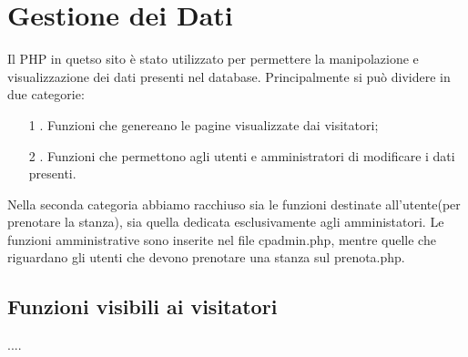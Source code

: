 \section{Gestione dei Dati}
Il PHP in quetso sito è stato utilizzato per permettere la manipolazione e visualizzazione dei dati presenti nel database. Principalmente si può dividere in due categorie:
\begin{itemize}
	\item [1]. Funzioni che genereano le pagine visualizzate dai visitatori;
	\item [2]. Funzioni che permettono agli utenti e amministratori di modificare i dati presenti.
\end{itemize}
Nella seconda categoria abbiamo racchiuso sia le funzioni destinate all'utente(per prenotare la stanza), sia quella dedicata esclusivamente agli amministatori. Le funzioni amministrative sono inserite nel file cpadmin.php, mentre quelle che riguardano gli utenti che devono prenotare una stanza sul prenota.php.
\subsection{Funzioni visibili ai visitatori}
....

